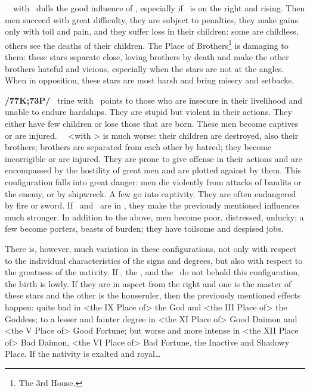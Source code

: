 \Saturn\, \Square\, with \Jupiter\, \marginnote{\Saturn \Square \Jupiter} dulls the good influence of \Jupiter, especially if \Saturn\, is on the right and rising. Then men succeed with great difficulty, they are subject to penalties, they make gains only with
toil and pain, and they suffer loss in their children: some are childless, others see the deaths of their children. The Place of Brothers\footnote{The 3rd House.} is damaging to them: these stars separate close, loving brothers by death and make the other brothers hateful and vicious, especially when the stars are not at the angles. When in opposition, these stars are most harsh and bring misery and setbacks.

\textbf{/77K;73P/} \Saturn\, \marginnote{\Saturn \Trine \Mars} trine with \Mars\, points to those who are insecure in their livelihood and unable to endure hardships. They are stupid but violent in their actions. They either have few children or lose those that are born. These men become captives or are injured. \Saturn\, \Square\, <with \Mars> is much worse: their children are destroyed, also their brothers; brothers are separated from each other by hatred; they become incorrigible or are injured. They are prone to give offense in their actions and are encompassed by the hostility of great men and are plotted against by them. This configuration falls into great danger: men die violently from attacks of bandits or the enemy, or by shipwreck. A few go into captivity. They are often endangered by fire or sword. If \Saturn\, and \Mars\, are in \Opposition, they make the previously mentioned influences much stronger. In addition to the above, men become poor, distressed, unlucky; a few become porters, beasts of burden; they have toilsome and despised jobs. 

There \mndl is, however, much variation in these configurations, not only with respect to the individual characteristics of the signs and degrees, but also with respect to the greatness of the nativity. If \Jupiter, the
\Moon, and the \Sun\, do not behold this configuration, the birth is lowly. If they are in aspect from the right
and one is the master of these stars and the other is the houseruler, then the previously mentioned effects happen: quite bad in <the IX Place of> the God and <the III Place of> the Goddess; to a lesser and fainter degree in <the XI Place of> Good Daimon and <the V Place of> Good Fortune; but worse and more intense in <the XII Place of> Bad Daimon, <the VI Place of> Bad Fortune, the Inactive and Shadowy Place. If the nativity is exalted and royal\ldots

